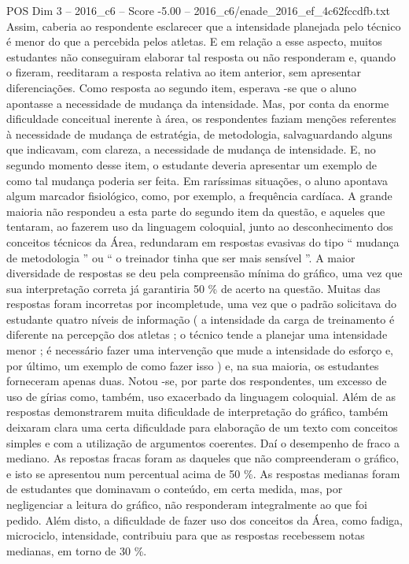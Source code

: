 \begin{textsample}{POS Dim 3 – 2016\_c6 – Score -5.00 – 2016\_c6/enade\_2016\_ef\_4c62fccdfb.txt}
Assim, caberia ao respondente esclarecer que a intensidade planejada pelo técnico é menor do que a percebida pelos atletas.
E em relação a esse aspecto, muitos estudantes não conseguiram elaborar tal resposta ou não responderam e, quando o fizeram, reeditaram a resposta relativa ao item anterior, sem apresentar diferenciações.
Como resposta ao segundo item, esperava -se que o aluno apontasse a necessidade de mudança da intensidade.
Mas, por conta da enorme dificuldade conceitual inerente à área, os respondentes faziam menções referentes à necessidade de mudança de estratégia, de metodologia, salvaguardando alguns que indicavam, com clareza, a necessidade de mudança de intensidade.
E, no segundo momento desse item, o estudante deveria apresentar um exemplo de como tal mudança poderia ser feita.
Em raríssimas situações, o aluno apontava algum marcador fisiológico, como, por exemplo, a frequência cardíaca.
A grande maioria não respondeu a esta parte do segundo item da questão, e aqueles que tentaram, ao fazerem uso da linguagem coloquial, junto ao desconhecimento dos conceitos técnicos da Área, redundaram em respostas evasivas do tipo “ mudança de metodologia ” ou “ o treinador tinha que ser mais sensível ”.
A maior diversidade de respostas se deu pela compreensão mínima do gráfico, uma vez que sua interpretação correta já garantiria 50 \% de acerto na questão.
Muitas das respostas foram incorretas por incompletude, uma vez que o padrão solicitava do estudante quatro níveis de informação ( a intensidade da carga de treinamento é diferente na percepção dos atletas ; o técnico tende a planejar uma intensidade menor ; é necessário fazer uma intervenção que mude a intensidade do esforço e, por último, um exemplo de como fazer isso ) e, na sua maioria, os estudantes forneceram apenas duas.
Notou -se, por parte dos respondentes, um excesso de uso de gírias como, também, uso exacerbado da linguagem coloquial.
Além de as respostas demonstrarem muita dificuldade de interpretação do gráfico, também deixaram clara uma certa dificuldade para elaboração de um texto com conceitos simples e com a utilização de argumentos coerentes.
Daí o desempenho de fraco a mediano.
As repostas fracas foram as daqueles que não compreenderam o gráfico, e isto se apresentou num percentual acima de 50 \%.
As respostas medianas foram de estudantes que dominavam o conteúdo, em certa medida, mas, por negligenciar a leitura do gráfico, não responderam integralmente ao que foi pedido.
Além disto, a dificuldade de fazer uso dos conceitos da Área, como fadiga, microciclo, intensidade, contribuiu para que as respostas recebessem notas medianas, em torno de 30 \%.

\end{textsample}

